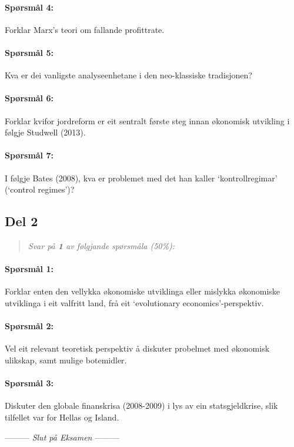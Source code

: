\documentclass[a4paper,12pt,fleqn]{article}
\newcommand{\sisteordnn}{Slut på Eksamen}
\begin{document}
\paragraph{\textbf{Spørsmål 4:}}

Forklar Marx's teori om fallande profittrate.

\paragraph{\textbf{Spørsmål 5:}}

Kva er dei vanligste analyseenhetane i den neo-klassiske tradisjonen?

\paragraph{\textbf{Spørsmål 6:}}

Forklar kvifor jordreform er eit sentralt første steg innan økonomisk utvikling
i følgje Studwell (2013).

\paragraph{\textbf{Spørsmål 7:}}

I følgje Bates (2008), kva er problemet med det han kaller `kontrollregimar' (`control
regimes')?

\bigskip
\subsection*{Del 2}
\begin{quote}
	\textit{Svar på \textbf{1} av følgjande spørsmåla (50\%):}
\end{quote}

\paragraph{\textbf{Spørsmål 1:}}

Forklar enten den vellykka økonomiske utviklinga eller mislykka økonomiske
utviklinga i eit valfritt land, frå eit `evolutionary economics'-perspektiv.

\paragraph{\textbf{Spørsmål 2:}}

Vel eit relevant teoretisk perspektiv å diskuter probelmet med økonomisk
ulikskap, samt mulige botemidler.

\paragraph{\textbf{Spørsmål 3:}}

Diskuter den globale finanskrisa (2008-2009) i lys av ein statsgjeldkrise, slik
tilfellet var for Hellas og Island.

\begin{center}
\vspace{3cm}
--------- \textit{\sisteordnn} ---------
\end{center}

\label{finalpage}
\end{document}

